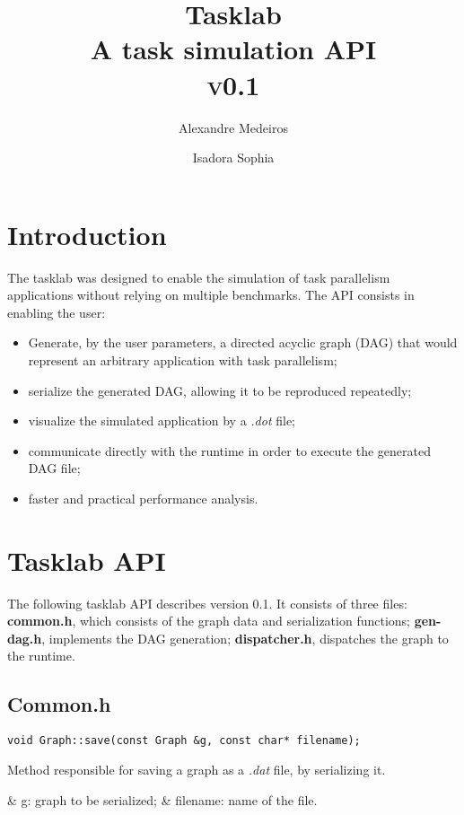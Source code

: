 \documentclass[a4paper,10pt]{article}
\title {
    \normalfont \normalsize
    \huge Tasklab\\ %
    \normalfont \normalsize {A task simulation API}\\
    \textsc{v0.1} \\ [8pt]
}
\author{Alexandre Medeiros \and Isadora Sophia}
\date{}
\begin{document}
\maketitle

\section{Introduction}
    The tasklab was designed to enable the simulation of task parallelism applications without relying on multiple benchmarks. The API consists in enabling the user:
    \begin{itemize}
        \item Generate, by the user parameters, a directed acyclic graph (DAG) that would represent an arbitrary application with task parallelism;
        \item serialize the generated DAG, allowing it to be reproduced repeatedly;
        \item visualize the simulated application by a \textit{.dot} file;
        \item communicate directly with the runtime in order to execute the generated DAG file;
        \item faster and practical performance analysis.
    \end{itemize}

\section{Tasklab API}
    The following tasklab API describes version 0.1. It consists of three files: \textbf{common.h}, which consists of the graph data and serialization functions; \textbf{gen-dag.h}, implements the DAG generation; \textbf{dispatcher.h}, dispatches the graph to the runtime.

    \subsection{Common.h}
        \begin{lstlisting}
void Graph::save(const Graph &g, const char* filename);
        \end{lstlisting}

        Method responsible for saving a graph as a \textit{.dat} file, by serializing it.
        \vspace{1mm} 

        \begin{easylist}
            & g: graph to be serialized;
            & filename: name of the file.
        \end{easylist}
\end{document}
